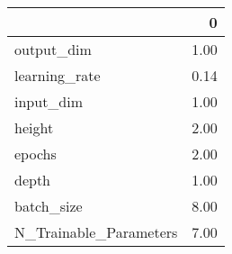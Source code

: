 \begin{tabular}{lr}
\toprule
{} &     0 \\
\midrule
output\_dim             &  1.00 \\
learning\_rate          &  0.14 \\
input\_dim              &  1.00 \\
height                 &  2.00 \\
epochs                 &  2.00 \\
depth                  &  1.00 \\
batch\_size             &  8.00 \\
N\_Trainable\_Parameters &  7.00 \\
\bottomrule
\end{tabular}
